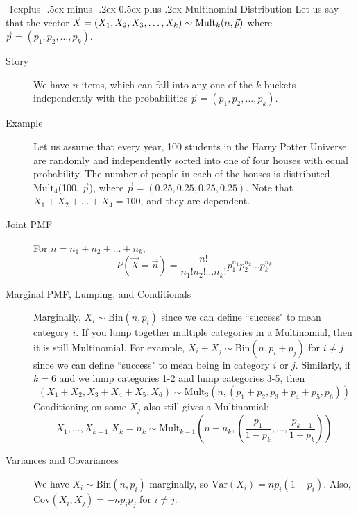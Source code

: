 \documentclass[10pt,landscape]{article}
\makeatletter
\newcommand{\var}{\textrm{Var}}
\newcommand{\cov}{\textrm{Cov}}
\newcommand{\Bin}{\textrm{Bin}}
\newcommand{\Mult}{\textrm{Mult}}
\renewcommand{\subsection}{\@startsection{subsection}{2}{0mm}%
                                {-1explus -.5ex minus -.2ex}%
                                {0.5ex plus .2ex}%
                                {\normalfont\normalsize\bfseries}}
\makeatother
\begin{document}
\begin{multicols*}{3}
    \subsection{Multinomial Distribution}
    Let us say that the vector $\vec{X} = (X_1, X_2, X_3, \dots, X_k) \sim \textnormal{Mult}_k(n, \vec{p})$  where $\vec{p} = (p_1, p_2, \dots, p_k)$.
    \begin{description}
        \item[Story]  We have $n$ items, which can fall into any one of the $k$ buckets independently with the probabilities $\vec{p} = (p_1, p_2, \dots, p_k)$.
        \item[Example]  Let us assume that every year, 100 students in the Harry Potter Universe are randomly and independently sorted into one of four houses with equal probability. The number of people in each of the houses is distributed $\Mult_4$(100, $\vec{p}$), where $\vec{p} = (0.25, 0.25, 0.25, 0.25)$.
        Note that $X_1 + X_2 + \dots + X_4 = 100$, and they are dependent.
        \item[Joint PMF]  For $n = n_1 + n_2 + \dots + n_k$,
        \[P(\vec{X} = \vec{n}) =  \frac{n!}{n_1!n_2!\dots n_k!}p_1^{n_1}p_2^{n_2}\dots p_k^{n_k}\]
        \item[Marginal PMF, Lumping, and Conditionals]
        Marginally, $X_i \sim \Bin(n,p_i)$ since we can define ``success" to mean category $i$. If you lump together multiple categories in a Multinomial, then it is still Multinomial. For example, $X_i + X_j \sim \Bin(n, p_i + p_j)$ for $i \neq j$ since we can define ``success" to mean being in category $i$ or $j$. Similarly, if $k=6$ and we lump categories 1-2 and lump categories 3-5, then
        \[ (X_1+X_2,X_3+X_4+X_5,X_6) \sim \Mult_3(n, (p_1+p_2, p_3 + p_4+p_5,p_6))\]
        Conditioning on some $X_j$ also still gives a Multinomial:
        \[X_1, \dots, X_{k-1} | X_k = n_k \sim \Mult_{k-1}\left(n - n_k, \left(\frac{p_1}{1 - p_k}, \dots, \frac{p_{k-1}}{1 - p_k}\right)\right)\]
        \item[Variances and Covariances]  We have  $X_i \sim \Bin(n, p_i)$ marginally, so $\var(X_i) = np_i(1-p_i)$. Also, $\cov(X_i, X_j) = -np_ip_j$ for $i \neq j$.
    \end{description}
                                        
                                    

\end{multicols*}
\end{document}
